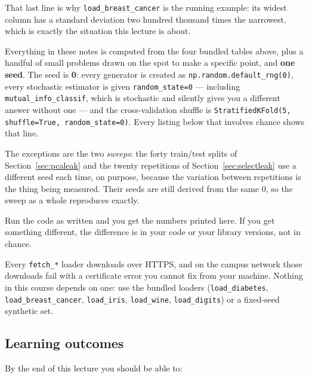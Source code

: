 \documentclass[11pt]{article}
\begin{document}
That last line is why \texttt{load\_breast\_cancer} is the running example:
its widest column has a standard deviation two hundred thousand times the
narrowest, which is exactly the situation this lecture is about.

\begin{keyidea}
Everything in these notes is computed from the four bundled tables above,
plus a handful of small problems drawn on the spot to make a specific point,
and \textbf{one seed}. The seed is \textbf{0}: every generator is created as
\texttt{np.random.default\_rng(0)}, every stochastic estimator is given
\texttt{random\_state=0} --- including \texttt{mutual\_info\_classif},
which is stochastic and silently gives you a different answer without one ---
and the cross-validation shuffle is \texttt{StratifiedKFold(5, shuffle=True,
random\_state=0)}. Every listing below that involves chance shows that line.

The exceptions are the two \emph{sweeps}: the forty train/test splits of
Section~\ref{sec:pcaleak} and the twenty repetitions of
Section~\ref{sec:selectleak} use a
different seed each time, on purpose, because the variation between
repetitions is the thing being measured. Their seeds are still derived from
the same $0$, so the sweep as a whole reproduces exactly.

Run the code as written and you get the numbers printed here. If you get
something different, the difference is in your code or your library versions,
not in chance.
\end{keyidea}

\begin{caution}
Every \texttt{fetch\_*} loader downloads over HTTPS, and on the campus network
those downloads fail with a certificate error you cannot fix from your machine.
Nothing in this course depends on one: use the bundled loaders
(\texttt{load\_diabetes}, \texttt{load\_breast\_cancer}, \texttt{load\_iris},
\texttt{load\_wine}, \texttt{load\_digits}) or a fixed-seed synthetic set.
\end{caution}

\subsection{Learning outcomes}

By the end of this lecture you should be able to:
\end{document}
